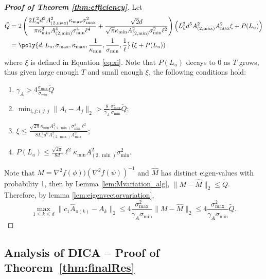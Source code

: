 \begin{proof}[{\bf Proof of Theorem  \ref{thm:efficiency}}]
Let 
 \begin{align*}
\tilde{Q} & = 2\left( \frac{2L_u^2d^2A_{(2,\max)}^2\kappa_{\max}\sigma_{\max}^2}{\pi\kappa^2_{\min}A^4_{(2,\min)}\sigma_{\min}^4\ell^4} + 
\frac{\sqrt{2}d}{\sqrt{\pi}\kappa_{\min}A^2_{(2,\min)}\sigma_{\min}^2\ell^2}
\right)\left(L_u^2d^5 A_{(2,\max)}^2A_{\max}^2\xi + P(L_u)\right) \\
& = \poly{d, L_u, \sigma_{\max}, \kappa_{\max}, \frac{1}{\kappa_{\min}}, \frac{1}{\sigma_{\min}}, \frac{1}{\ell}} \left(\xi + P(L_u) \right)
 \end{align*}
 where $\xi$ is defined in Equation \eqref{eq:xi}.
 Note that $P(L_u)$ decays to 0 as $T$ grows, thus given large enough $T$ and small enough $\xi$, the following conditions hold:
 \begin{enumerate}
 \item $\gamma_A > 4\frac{\sigma_{\max}}{\sigma_{\min}} \tilde{Q}$
 \item $\min_{i,j:i\neq j} \|A_i - A_j\|_2 > \frac{8}{\gamma_A}\frac{\sigma_{\max}^2}{\sigma_{\min}} \tilde{Q}$;
 \item $\xi \le \frac{\sqrt{2\pi}\kappa_{\min}A^2_{(2,\min)}\sigma_{\min}^2\ell^2}{8L_u^2d^6 A_{(2,\max)}^2A_{\max}^2}$;
 \item  $P(L_u) \le \frac{\sqrt{2\pi}}{8d}\ell^2\kappa_{\min}A^2_{(2,\min)}\sigma_{\min}^2$. 
  \end{enumerate}

Note that $M = \nabla^2f(\phi))(\nabla^2f(\psi))^{-1}$ and $\hat{M}$ has distinct eigen-values with probability 1,  then by Lemma \ref{lem:Mvariation_alg}, $\|M-\hat{M}\|_2 \le \tilde{Q}$.
Therefore, by lemma \ref{lem:eigenvectorvariation}, 
  \[
  \max_{1\le k\le d}\| c_1\hat{A}_{\pi(k)} - A_k\|_2 \le 4 \frac{\sigma_{\max}^2}{\gamma_A \sigma_{\min}}\|M - \hat{M} \|_2 \le 4 \frac{\sigma_{\max}^2}{\gamma_A \sigma_{\min}} \tilde{Q}. 
  \]
 
\end{proof}

\subsection{Analysis of DICA -- Proof of Theorem~\ref{thm:finalRes}}
\label{subsec:ProofModEff}

